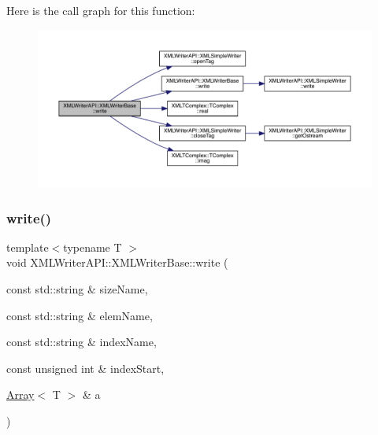 Here is the call graph for this function\+:
\nopagebreak
\begin{figure}[H]
\begin{center}
\leavevmode
\includegraphics[width=350pt]{d5/df5/classXMLWriterAPI_1_1XMLWriterBase_a00b5edcaf39f8bdaf2aa5eed7118c8e7_cgraph}
\end{center}
\end{figure}
\mbox{\label{classXMLWriterAPI_1_1XMLWriterBase_a85d9236f5ec6ccc3c8559d4ec431bf6b}} 
\subsubsection{\texorpdfstring{write()}{write()}\hspace{0.1cm}{\footnotesize\ttfamily [34/39]}}
{\footnotesize\ttfamily template$<$typename T $>$ \\
void X\+M\+L\+Writer\+A\+P\+I\+::\+X\+M\+L\+Writer\+Base\+::write (\begin{DoxyParamCaption}\item[{const std\+::string \&}]{size\+Name,  }\item[{const std\+::string \&}]{elem\+Name,  }\item[{const std\+::string \&}]{index\+Name,  }\item[{const unsigned int \&}]{index\+Start,  }\item[{\mbox{\hyperlink{classXMLArray_1_1Array}{Array}}$<$ T $>$ \&}]{a }\end{DoxyParamCaption})\hspace{0.3cm}{\ttfamily [inline]}}

